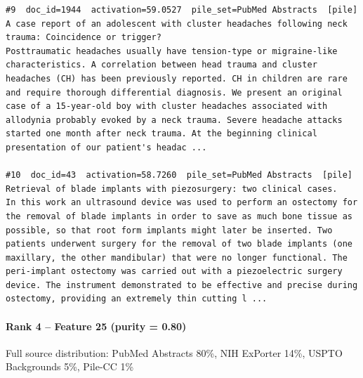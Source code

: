 \begin{verbatim}
#9  doc_id=1944  activation=59.0527  pile_set=PubMed Abstracts  [pile]
A case report of an adolescent with cluster headaches following neck trauma: Coincidence or trigger?
Posttraumatic headaches usually have tension-type or migraine-like characteristics. A correlation between head trauma and cluster headaches (CH) has been previously reported. CH in children are rare and require thorough differential diagnosis. We present an original case of a 15-year-old boy with cluster headaches associated with allodynia probably evoked by a neck trauma. Severe headache attacks started one month after neck trauma. At the beginning clinical presentation of our patient's headac ...

#10  doc_id=43  activation=58.7260  pile_set=PubMed Abstracts  [pile]
Retrieval of blade implants with piezosurgery: two clinical cases.
In this work an ultrasound device was used to perform an ostectomy for the removal of blade implants in order to save as much bone tissue as possible, so that root form implants might later be inserted. Two patients underwent surgery for the removal of two blade implants (one maxillary, the other mandibular) that were no longer functional. The peri-implant ostectomy was carried out with a piezoelectric surgery device. The instrument demonstrated to be effective and precise during ostectomy, providing an extremely thin cutting l ...

\end{verbatim}

\paragraph*{Rank 4 -- Feature 25 (purity = 0.80)}

Full source distribution: PubMed Abstracts 80\%, NIH ExPorter 14\%, USPTO Backgrounds 5\%, Pile-CC 1\%

